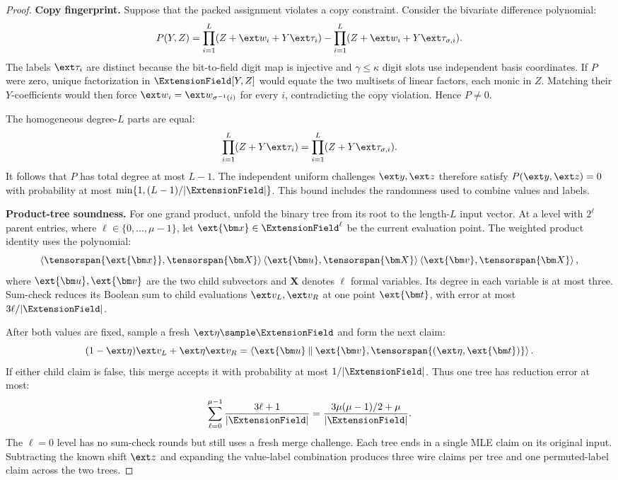 \begin{proof}
\smallskip\noindent\textbf{Copy fingerprint.}
Suppose that the packed assignment violates a copy constraint.
Consider the bivariate difference polynomial:
\[
    P(Y,Z)=
       \prod_{i=1}^{L}(Z+\ext w_i+Y\ext\tau_i)
       -\prod_{i=1}^{L}(Z+\ext w_i+Y\ext\tau_{\sigma,i}).
\]
The labels \(\ext\tau_i\) are distinct because the bit-to-field
digit map is injective and \(\gamma\leq\kappa\) digit slots use
independent basis coordinates.
If \(P\) were zero, unique factorization in
\(\ExtensionField[Y,Z]\) would equate the two multisets of
linear factors, each monic in \(Z\).
Matching their \(Y\)-coefficients would then force
\(\ext w_i=\ext w_{\sigma^{-1}(i)}\) for every \(i\),
contradicting the copy violation. Hence \(P\ne0\).

The homogeneous degree-\(L\) parts are equal:
\[
    \prod_{i=1}^{L}(Z+Y\ext\tau_i)
       =\prod_{i=1}^{L}(Z+Y\ext\tau_{\sigma,i}).
\]
It follows that \(P\) has total degree at most \(L-1\).
The independent uniform challenges \(\ext y,\ext z\) therefore
satisfy \(P(\ext y,\ext z)=0\) with probability at most
\(\min\{1,(L-1)/|\ExtensionField|\}\).
This bound includes the randomness used to combine values and labels.

\smallskip\noindent\textbf{Product-tree soundness.}
For one grand product, unfold the binary tree from its root
to the length-\(L\) input vector.
At a level with \(2^\ell\) parent entries, where
\(\ell\in\{0,\ldots,\mu-1\}\), let
\(\ext{\bm x}\in\ExtensionField^\ell\) be the current
evaluation point.
The weighted product identity uses the polynomial:
\[
    \left\langle
       \tensorspan{\ext{\bm x}},\tensorspan{\bm X}
    \right\rangle
    \left\langle\ext{\bm u},\tensorspan{\bm X}\right\rangle
    \left\langle\ext{\bm v},\tensorspan{\bm X}\right\rangle,
\]
where \(\ext{\bm u},\ext{\bm v}\) are the two child subvectors
and \(\bm X\) denotes \(\ell\) formal variables.
Its degree in each variable is at most three.
Sum-check reduces its Boolean sum to child evaluations
\(\ext v_L,\ext v_R\) at one point \(\ext{\bm t}\), with
error at most \(3\ell/|\ExtensionField|\).

After both values are fixed, sample a fresh
\(\ext\eta\sample\ExtensionField\) and form the next claim:
\[
    (1-\ext\eta)\ext v_L+\ext\eta\ext v_R
       =
    \left\langle
       \ext{\bm u}\mathbin{\|}\ext{\bm v},
       \tensorspan{(\ext\eta,\ext{\bm t})}
    \right\rangle.
\]
If either child claim is false, this merge accepts it
with probability at most \(1/|\ExtensionField|\).
Thus one tree has reduction error at most:
\[
    \sum_{\ell=0}^{\mu-1}
       \frac{3\ell+1}{|\ExtensionField|}
       =
    \frac{3\mu(\mu-1)/2+\mu}{|\ExtensionField|}.
\]
The \(\ell=0\) level has no sum-check rounds but still uses
a fresh merge challenge.
Each tree ends in a single MLE claim on its original input.
Subtracting the known shift \(\ext z\) and expanding the
value-label combination produces three wire claims per tree
and one permuted-label claim across the two trees.


\end{proof}
